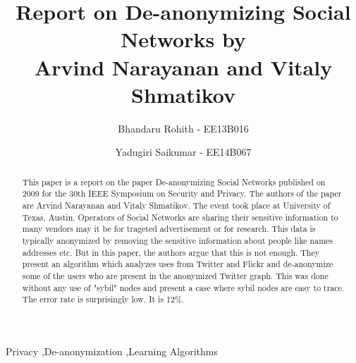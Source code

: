 \documentclass[preprint,12pt]{elsarticle}
\theoremstyle{definition}
\theoremstyle{remark}
\begin{document}
\begin{frontmatter}


\title{Report on De-anonymizing Social Networks by \\ Arvind Narayanan and Vitaly Shmatikov}




\author{Bhandaru Rohith - EE13B016}
\author{Yadugiri Saikumar - EE14B067}

\address{Indian Institute of Technology Madras}

\begin{abstract}
This paper is a report on the paper De-anonymizing Social Networks published on 2009 for the 30th IEEE Symposium on Security and Privacy. The authors of the paper are Arvind Narayanan and Vitaly Shmatikov. The event took place at University of Texas, Austin. Operators of Social Networks are sharing their sensitive information to many vendors may it be for trageted advertisement or for research. This data is typically anonymized by removing the sensitive information about people like names addresses etc. But in this paper, the authors argue that this is not enough. They present an algorithm which analyzes uses from Twitter and Flickr and de-anonymize some of the users who are present in the anonymized Twitter graph. This was done without any use of "sybil" nodes and present a case where sybil nodes are easy to trace. The error rate is surprisingly low. It is 12\%.
\end{abstract}

\begin{keyword}
Privacy \sep De-anonymization \sep Learning Algorithms


\end{keyword}

\end{frontmatter}
\end{document}
